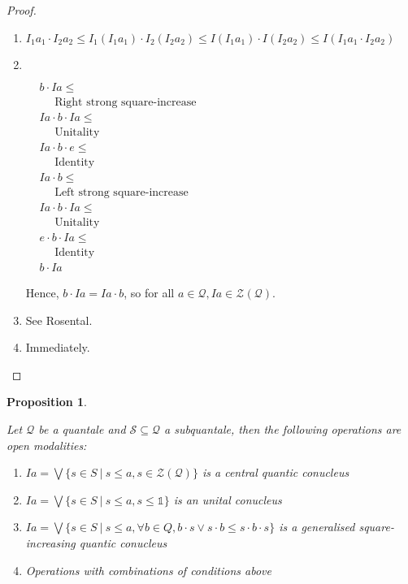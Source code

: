\documentclass[a4paper]{article}
\theoremstyle{defin}
\theoremstyle{theorem}
\theoremstyle{prop}
\newtheorem{prop}{Proposition}
\theoremstyle{lemma}
\theoremstyle{ex}
\theoremstyle{col}
\begin{document}
\begin{proof}
$ $

\begin{enumerate}
  \item $I_1 a_1 \cdot I_2 a_2 \leq I_1 (I_1 a_1) \cdot I_2 (I_2 a_2) \leq I (I_1 a_1) \cdot I (I_2 a_2) \leq I (I_1 a_1 \cdot I_2 a_2)$
  \item $ $

    $\begin{array}{lll}
    & b \cdot I a \leq & \\
    & \:\:\:\:\:\: \text{Right strong square-increase}& \\
    &I a \cdot b \cdot I a \leq & \\
    & \:\:\:\:\:\: \text{Unitality}& \\
    & I a \cdot b \cdot e \leq & \\
    & \:\:\:\:\:\: \text{Identity}& \\
    &I a \cdot b \leq & \\
    & \:\:\:\:\:\: \text{Left strong square-increase}& \\
    &I a \cdot b \cdot I a \leq & \\
    & \:\:\:\:\:\: \text{Unitality}& \\
    &e \cdot b \cdot I a \leq & \\
    & \:\:\:\:\:\: \text{Identity}& \\
    &b \cdot I a&
    \end{array}$

  Hence, $b \cdot I a = I a \cdot b$, so for all $a \in \mathcal{Q}, I a \in \mathcal{Z}(\mathcal{Q})$.
  \item See Rosental.
  \item Immediately.
\end{enumerate}
\end{proof}

\begin{prop}
$ $

Let $\mathcal{Q}$ be a quantale and $\mathcal{S} \subseteq \mathcal{Q}$ a subquantale, then the following operations are open modalities:

\begin{enumerate}
  \item $I a = \bigvee \{ s \in S \: | \: s \leq a, s \in \mathcal{Z}(\mathcal{Q}) \}$ is a central quantic conucleus
  \item $I a = \bigvee \{ s \in S \: | \: s \leq a, s \leq \mathds{1} \}$ is an unital conucleus
  \item $I a = \bigvee \{ s \in S \: | \: s \leq a, \forall b \in Q, b \cdot s \vee s \cdot b \leq s \cdot b \cdot s\}$ is a generalised square-increasing quantic conucleus
  \item Operations with combinations of conditions above
\end{enumerate}
\end{prop}
\end{document}
